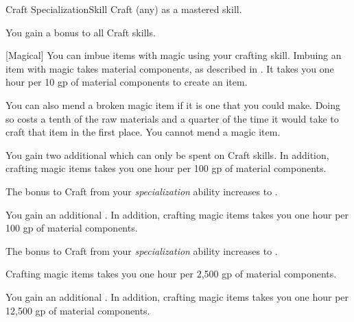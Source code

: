     \begin{feat}{Craft Specialization}{Skill}
        \featpre Craft (any) as a mastered skill.

         You gain a  bonus to all Craft skills.

        [Magical] You can imbue items with magic using your crafting skill.
        Imbuing an item with magic takes material components, as described in .
        It takes you one hour per 10 gp of material components to create an item.

        You can also mend a broken magic item if it is one that you could make.
        Doing so costs a tenth of the raw materials and a quarter of the time it would take to craft that item in the first place.
        You cannot mend a  magic item.

         You gain two additional  which can only be spent on Craft skills.
        In addition, crafting magic items takes you one hour per 100 gp of material components.

         The bonus to Craft from your \textit{specialization} ability increases to .

         You gain an additional .
        In addition, crafting magic items takes you one hour per 100 gp of material components.

         The bonus to Craft from your \textit{specialization} ability increases to .

        \ff[17]{}
        Crafting magic items takes you one hour per 2,500 gp of material components.

         You gain an additional .
        In addition, crafting magic items takes you one hour per 12,500 gp of material components.
    \end{feat}

